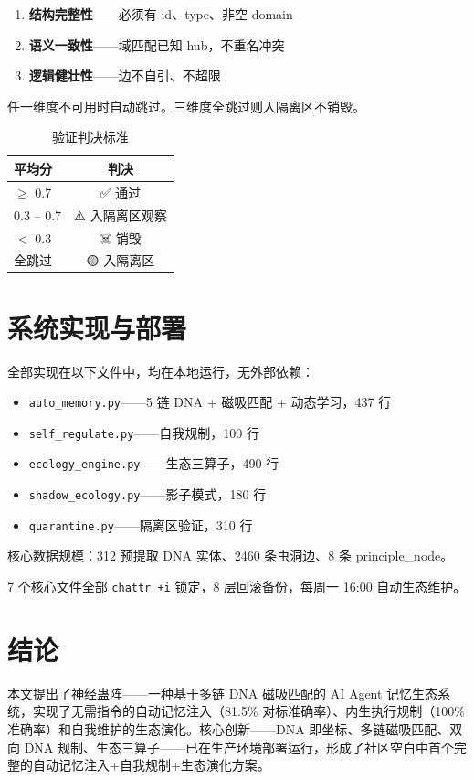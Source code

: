 \documentclass[11pt,a4paper]{article}
\begin{document}
\begin{enumerate}
  \item \textbf{结构完整性}——必须有 id、type、非空 domain
  \item \textbf{语义一致性}——域匹配已知 hub，不重名冲突
  \item \textbf{逻辑健壮性}——边不自引、不超限
\end{enumerate}

任一维度不可用时自动跳过。三维度全跳过则入隔离区不销毁。

\begin{table}[ht]
\centering
\caption{验证判决标准}
\label{tab:quarantine}
\begin{tabular}{lc}
\toprule
平均分 & 判决 \\
\midrule
$\geq$ 0.7 & ✅ 通过 \\
0.3 -- 0.7 & ⚠️ 入隔离区观察 \\
$<$ 0.3 & ☠️ 销毁 \\
全跳过 & 🟡 入隔离区 \\
\bottomrule
\end{tabular}
\end{table}

\section{系统实现与部署}
全部实现在以下文件中，均在本地运行，无外部依赖：

\begin{itemize}
  \item \texttt{auto\_memory.py}——5 链 DNA + 磁吸匹配 + 动态学习，437 行
  \item \texttt{self\_regulate.py}——自我规制，100 行
  \item \texttt{ecology\_engine.py}——生态三算子，490 行
  \item \texttt{shadow\_ecology.py}——影子模式，180 行
  \item \texttt{quarantine.py}——隔离区验证，310 行
\end{itemize}

核心数据规模：312 预提取 DNA 实体、2460 条虫洞边、8 条 principle\_node。

7 个核心文件全部 \texttt{chattr +i} 锁定，8 层回滚备份，每周一 16:00 自动生态维护。

\section{结论}
本文提出了神经蛊阵——一种基于多链 DNA 磁吸匹配的 AI Agent 记忆生态系统，实现了无需指令的自动记忆注入（81.5\% 对标准确率）、内生执行规制（100\% 准确率）和自我维护的生态演化。核心创新——DNA 即坐标、多链磁吸匹配、双向 DNA 规制、生态三算子——已在生产环境部署运行，形成了社区空白中首个完整的自动记忆注入+自我规制+生态演化方案。
\end{document}
